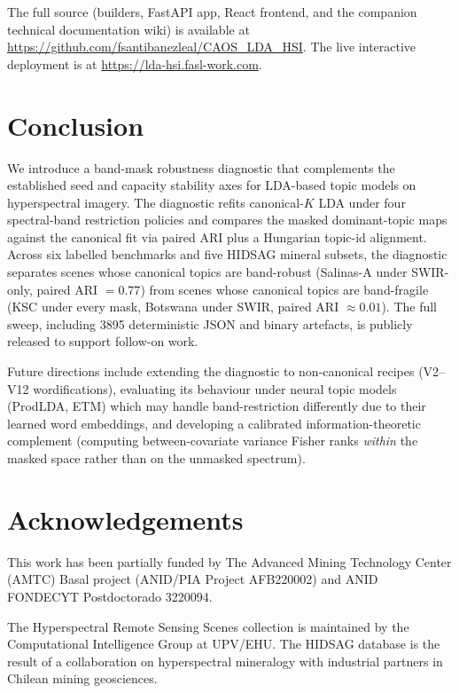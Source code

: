 \documentclass[conference,a4paper,10pt]{IEEEtran}
\begin{document}
The full source (builders, FastAPI app, React frontend, and the
companion technical documentation wiki) is available at
\url{https://github.com/fsantibanezleal/CAOS_LDA_HSI}. The live
interactive deployment is at \url{https://lda-hsi.fasl-work.com}.

\section{Conclusion}
\label{sec:conclusion}

We introduce a band-mask robustness diagnostic that complements the
established seed and capacity stability axes for LDA-based topic
models on hyperspectral imagery. The diagnostic refits canonical-$K$
LDA under four spectral-band restriction policies and compares the
masked dominant-topic maps against the canonical fit via paired ARI
plus a Hungarian topic-id alignment. Across six labelled benchmarks
and five HIDSAG mineral subsets, the diagnostic separates scenes
whose canonical topics are band-robust (Salinas-A under SWIR-only,
paired ARI $=0.77$) from scenes whose canonical topics are
band-fragile (KSC under every mask, Botswana under SWIR, paired ARI
$\approx 0.01$). The full sweep, including 3895 deterministic JSON and binary artefacts,
is publicly released to support follow-on work.

Future directions include extending the diagnostic to non-canonical
recipes (V2--V12 wordifications), evaluating its behaviour under
neural topic models (ProdLDA, ETM) which may handle band-restriction
differently due to their learned word embeddings, and developing a
calibrated information-theoretic complement (computing
between-covariate variance Fisher ranks \emph{within} the masked
space rather than on the unmasked spectrum).

\section*{Acknowledgements}

This work has been partially funded by The Advanced Mining Technology
Center (AMTC) Basal project (ANID/PIA Project AFB220002) and ANID
FONDECYT Postdoctorado 3220094.

The Hyperspectral Remote Sensing Scenes collection is maintained by
the Computational Intelligence Group at UPV/EHU. The HIDSAG
database is the result of a collaboration on hyperspectral
mineralogy with industrial partners in Chilean mining geosciences.
\end{document}
